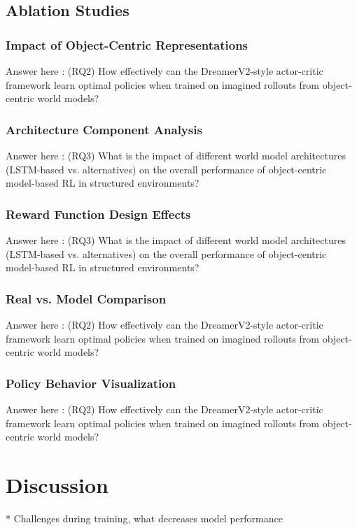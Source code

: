 \documentclass[
	english,
	ruledheaders=section,
	class=report,
	thesis={type=master},
	accentcolor=9c,
	custommargins=true,
	marginpar=false,
	parskip=half-,
	fontsize=11pt,
]{tudapub}
\begin{document}
\section{Ablation Studies}
\label{sec:ablation_studies}

\subsection{Impact of Object-Centric Representations}
\label{subsec:oc_impact}
Answer here : (RQ2) How effectively can the DreamerV2-style actor-critic framework learn optimal policies when trained on imagined rollouts from object-centric world models?

\subsection{Architecture Component Analysis}
\label{subsec:architecture_analysis}
Answer here : (RQ3) What is the impact of different world model architectures (LSTM-based vs. alternatives) on the overall performance of object-centric model-based RL in structured environments?

\subsection{Reward Function Design Effects}
\label{subsec:reward_effects}
Answer here : (RQ3) What is the impact of different world model architectures (LSTM-based vs. alternatives) on the overall performance of object-centric model-based RL in structured environments?

\subsection{Real vs. Model Comparison}
\label{subsec:real_vs_model}
Answer here : (RQ2) How effectively can the DreamerV2-style actor-critic framework learn optimal policies when trained on imagined rollouts from object-centric world models?

\subsection{Policy Behavior Visualization}
\label{subsec:policy_visualization}
Answer here : (RQ2) How effectively can the DreamerV2-style actor-critic framework learn optimal policies when trained on imagined rollouts from object-centric world models?

\chapter{Discussion}
\label{chap:discussion}
* Challenges during training, what decreases model performance
\end{document}
